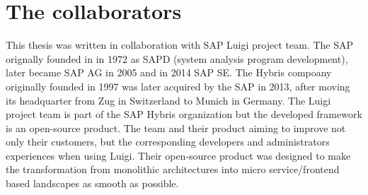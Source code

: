 \section{The collaborators}

This thesis was written in collaboration with SAP Luigi project team. The SAP orignally founded in in 1972 as SAPD (system analysis program development), later became SAP AG in 2005 and in 2014 SAP SE. The Hybris compoany originally founded in 1997 was later acquired by the SAP in 2013, after moving its headquarter from Zug in Switzerland to Munich in Germany. The Luigi project team is part of the SAP Hybris organization but the developed framework is an open-source product. The team and their product aiming to improve not only their customers, but the corresponding developers and administrators experiences when using Luigi. Their open-source product was designed to make the transformation from monolithic architectures into micro service/frontend based landscapes as smooth as possible. 

 
